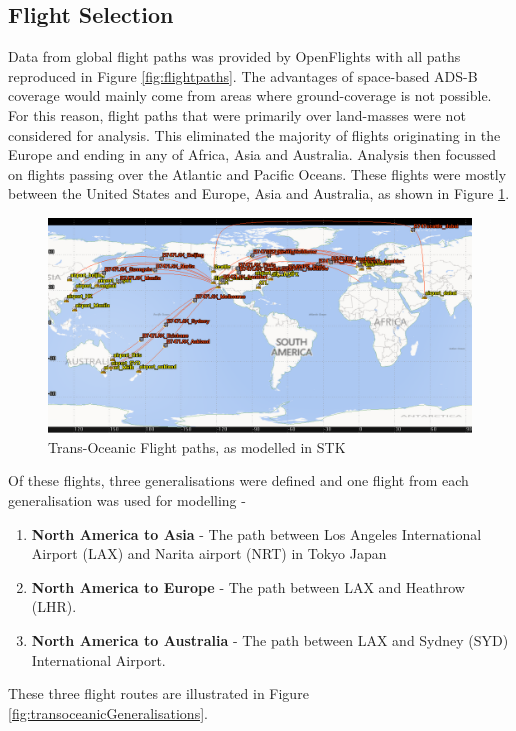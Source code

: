 \subsection{Flight Selection} \label{sec:flight_selection}
Data from global flight paths was provided by OpenFlights \cite{Open} with all  paths reproduced in Figure \ref{fig:flightpaths}. The advantages of space-based ADS-B coverage would mainly come from areas where ground-coverage is not possible.  For this reason, flight paths that were primarily over land-masses were not considered for analysis. This eliminated the majority of flights originating in the Europe and ending in any of Africa, Asia and Australia. Analysis then focussed on flights passing over the Atlantic and Pacific Oceans. These flights were mostly between the United States and Europe, Asia and Australia, as shown in Figure \ref{fig:transoceanicflights}.

\begin{figure}[H]
	\centering
	\includegraphics[scale = 0.42]{Pictures/transoceanicflights.png}
	
	\caption{Trans-Oceanic Flight paths, as modelled in STK}
	\label{fig:transoceanicflights}
\end{figure} 

Of these flights, three generalisations were defined and one flight from each generalisation was used for modelling -
\begin{enumerate}
	\item \textbf{North America to Asia} - The path between Los Angeles International Airport (LAX) and Narita airport (NRT) in Tokyo Japan 
	\item \textbf{North America to Europe} - The path between LAX and Heathrow (LHR).
	\item \textbf{North America to Australia} - The path between LAX and Sydney (SYD) International Airport.
\end{enumerate}
These three flight routes are illustrated in Figure \ref{fig:transoceanicGeneralisations}.

